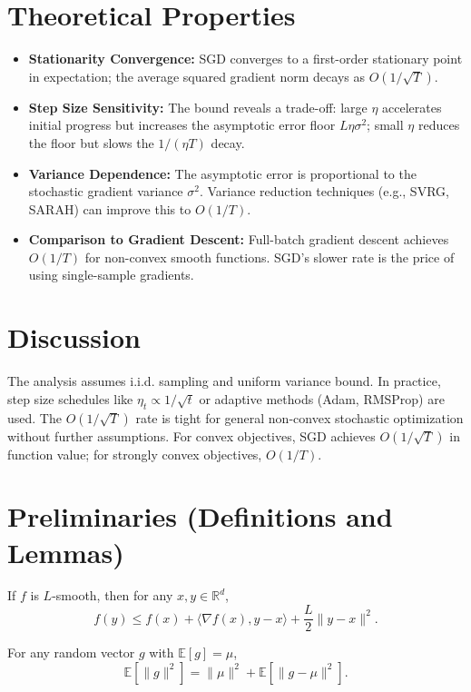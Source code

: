 \documentclass{article}
\begin{document}
\section*{Theoretical Properties}
\begin{itemize}
    \item \textbf{Stationarity Convergence:} SGD converges to a first-order stationary point in expectation; the average squared gradient norm decays as $O(1/\sqrt{T})$.
    \item \textbf{Step Size Sensitivity:} The bound reveals a trade-off: large $\eta$ accelerates initial progress but increases the asymptotic error floor $L\eta\sigma^2$; small $\eta$ reduces the floor but slows the $1/(\eta T)$ decay.
    \item \textbf{Variance Dependence:} The asymptotic error is proportional to the stochastic gradient variance $\sigma^2$. Variance reduction techniques (e.g., SVRG, SARAH) can improve this to $O(1/T)$.
    \item \textbf{Comparison to Gradient Descent:} Full-batch gradient descent achieves $O(1/T)$ for non-convex smooth functions. SGD's slower rate is the price of using single-sample gradients.
\end{itemize}

\section*{Discussion}
The analysis assumes i.i.d. sampling and uniform variance bound. In practice, step size schedules like $\eta_t \propto 1/\sqrt{t}$ or adaptive methods (Adam, RMSProp) are used. The $O(1/\sqrt{T})$ rate is tight for general non-convex stochastic optimization without further assumptions. For convex objectives, SGD achieves $O(1/\sqrt{T})$ in function value; for strongly convex objectives, $O(1/T)$.

\section*{Preliminaries (Definitions and Lemmas)}
\begin{lemma}
If $f$ is $L$-smooth, then for any $x,y \in \mathbb{R}^d$,
\begin{equation}
    f(y) \le f(x) + \langle \nabla f(x), y-x \rangle + \frac{L}{2} \|y-x\|^2.
\end{equation}
\end{lemma}
\begin{lemma}
For any random vector $g$ with $\mathbb{E}[g] = \mu$,
\begin{equation}
    \mathbb{E}[\|g\|^2] = \|\mu\|^2 + \mathbb{E}[\|g - \mu\|^2].
\end{equation}
\end{lemma}
\end{document}

